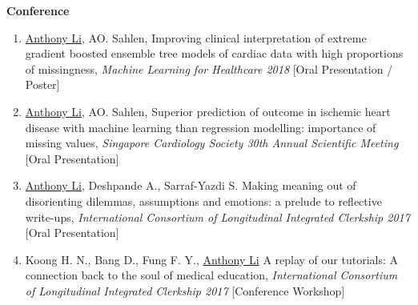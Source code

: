 \documentclass[letterpaper,10pt,oneside]{article}
\begin{document}
\begin{body}


\textbf{Conference}
\GapNoBreak

\begin{enumerate}

\item \underline{Anthony Li}, AO. Sahlen, \textcolor{mygray}{Improving clinical interpretation of extreme gradient boosted ensemble tree models of cardiac data with high proportions of missingness}, \textit{Machine Learning for Healthcare 2018} [Oral Presentation / Poster]

\item \underline{Anthony Li}, AO. Sahlen, \textcolor{mygray}{Superior prediction of outcome in ischemic heart disease with machine learning than regression modelling: importance of missing values}, \textit{Singapore Cardiology Society 30th Annual Scientific Meeting}
[Oral Presentation]

\item \underline{Anthony Li}, Deshpande A., Sarraf-Yazdi S. \textcolor{mygray}{Making meaning out of disorienting dilemmas, assumptions and emotions: a prelude to reflective write-ups}, \textit{International Consortium of Longitudinal Integrated Clerkship 2017}
[Oral Presentation]

\item Koong H. N., Bang D., Fung F. Y., \underline{Anthony Li} \textcolor{mygray}{A replay of our tutorials: A connection back to the soul of medical education}, \textit{International Consortium of Longitudinal Integrated Clerkship 2017}
[Conference Workshop]

\end{enumerate}




%


\end{body}
\end{document}
